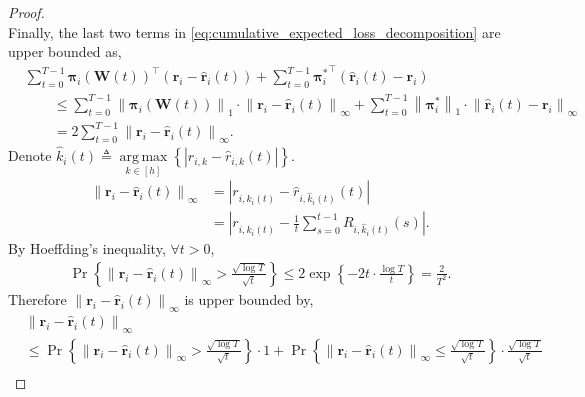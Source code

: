 \documentclass[10pt]{article}
\def\rvr{{\mathbf{r}}}
\def\rvpi{{\boldsymbol{\pi}}}
\def\rmW{{\mathbf{W}}}
\DeclareMathOperator*{\argmax}{arg\,max}
\DeclareMathOperator*{\probability}{Pr}
\begin{document}
\begin{proof}
\begin{equation}
\end{equation}
Finally, the last two terms in \cref{eq:cumulative_expected_loss_decomposition} are upper bounded as,
\begin{equation}
\label{eq:last_two_terms_upper_bound}
\begin{split}
    &\sum\limits_{t=0}^{T-1}{ \rvpi_i\left(\rmW(t)\right)^\top \left( \rvr_i - \hat{\rvr}_i(t) \right) } + \sum\limits_{t=0}^{T-1}{ {\rvpi_i^*}^\top \left( \hat{\rvr}_i(t) - \rvr_i \right) } \\
    &\qquad \le \sum\limits_{t=0}^{T-1}{ \left\| \rvpi_i\left(\rmW(t)\right)\right\|_1 \cdot \left\| \rvr_i - \hat{\rvr}_i(t) \right\|_\infty } + \sum\limits_{t=0}^{T-1}{ \left\| {\rvpi_i^*} \right\|_1 \cdot \left\| \hat{\rvr}_i(t) - \rvr_i \right\|_\infty } \\
    &\qquad = 2 \sum\limits_{t=0}^{T-1}{ \left\| \rvr_i - \hat{\rvr}_i(t) \right\|_\infty }.
\end{split}
\end{equation}
Denote $\hat{k}_i(t) \triangleq \argmax\limits_{k \in [h]}{ \left\{ \left| r_{i,k} - \hat{r}_{i,k}(t) \right| \right\}}$.
\begin{equation*}
\begin{split}
    \left\| \rvr_i - \hat{\rvr}_i(t) \right\|_\infty &= \left| r_{i, \hat{k}_i(t)} - \hat{r}_{i,\hat{k}_i(t)}(t) \right| \\
    &= \left| r_{i, \hat{k}_i(t)} - \frac{1}{t} \sum\limits_{s=0}^{t-1}{R_{i, \hat{k}_i(t)}(s)} \right|.
\end{split}
\end{equation*}
By Hoeffding's inequality, $\forall t > 0$,
\begin{equation*}
\begin{split}
    \probability{\left\{ \left\| \rvr_i - \hat{\rvr}_i(t) \right\|_\infty > \frac{\sqrt{\log{T}}}{\sqrt{t}} \right\}} \le 2 \exp{\left\{ - 2 t \cdot \frac{\log{T}}{t}\right\}} = \frac{2}{T^2}.
\end{split}
\end{equation*}
Therefore $\left\| \rvr_i - \hat{\rvr}_i(t) \right\|_\infty$ is upper bounded by,
\begin{equation}
\label{eq:empirical_estimation_upper_bound}
\begin{split}
    &\left\| \rvr_i - \hat{\rvr}_i(t) \right\|_\infty \\
    & \le \probability{\left\{ \left\| \rvr_i - \hat{\rvr}_i(t) \right\|_\infty > \frac{\sqrt{\log{T}}}{\sqrt{t}} \right\}} \cdot 1 + \probability{\left\{ \left\| \rvr_i - \hat{\rvr}_i(t) \right\|_\infty \le \frac{\sqrt{\log{T}}}{\sqrt{t}} \right\}} \cdot \frac{\sqrt{\log{T}}}{\sqrt{t}} \\

\end{split}
\end{equation}
\end{proof}
\end{document}
